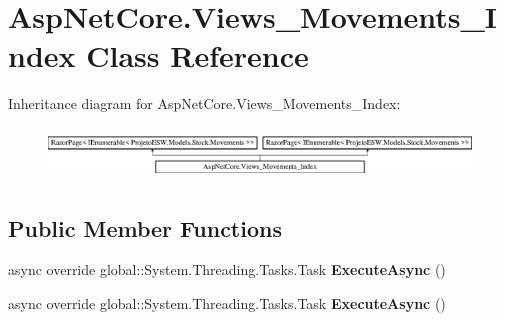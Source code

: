 \hypertarget{class_asp_net_core_1_1_views___movements___index}{}\section{Asp\+Net\+Core.\+Views\+\_\+\+Movements\+\_\+\+Index Class Reference}
\label{class_asp_net_core_1_1_views___movements___index}
Inheritance diagram for Asp\+Net\+Core.\+Views\+\_\+\+Movements\+\_\+\+Index\+:\begin{figure}[H]
\begin{center}
\leavevmode
\includegraphics[height=1.365854cm]{class_asp_net_core_1_1_views___movements___index}
\end{center}
\end{figure}
\subsection*{Public Member Functions}
\begin{DoxyCompactItemize}
\item 
\mbox{\label{class_asp_net_core_1_1_views___movements___index_aa71b8578c9c4401fe206e2b3a98abd9f}} 
async override global\+::\+System.\+Threading.\+Tasks.\+Task {\bfseries Execute\+Async} ()
\item 
\mbox{\label{class_asp_net_core_1_1_views___movements___index_aa71b8578c9c4401fe206e2b3a98abd9f}} 
async override global\+::\+System.\+Threading.\+Tasks.\+Task {\bfseries Execute\+Async} ()
\end{DoxyCompactItemize}
